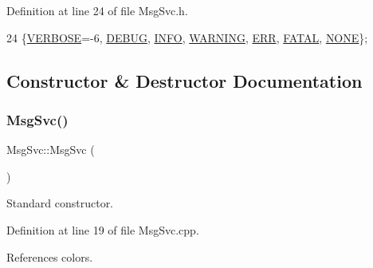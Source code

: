 Definition at line 24 of file Msg\+Svc.\+h.


\begin{DoxyCode}
24 \{\hyperlink{classMsgSvc_ae671eb7301996cd049d2da8a65925926af655256b06494ade5ba830abe5401ec9}{VERBOSE}=-6, \hyperlink{classMsgSvc_ae671eb7301996cd049d2da8a65925926a1dbdcc82dce88370ec335883c83b38b0}{DEBUG}, \hyperlink{classMsgSvc_ae671eb7301996cd049d2da8a65925926ad2fcf3f3e734fc41ee097cc23670ce51}{INFO}, \hyperlink{classMsgSvc_ae671eb7301996cd049d2da8a65925926a7cefae88f2ba26b2b05b676a383c834b}{WARNING}, \hyperlink{classMsgSvc_ae671eb7301996cd049d2da8a65925926a35a9d7166e9896af4ec8fb33bf5f1772}{ERR}, \hyperlink{classMsgSvc_ae671eb7301996cd049d2da8a65925926a59c73cb29edfc9cdf35845e2b1301363}{FATAL}, 
      \hyperlink{classMsgSvc_ae671eb7301996cd049d2da8a65925926a9be9ae32fed8e1e6eba4a58692210fbd}{NONE}\};
\end{DoxyCode}


\subsection{Constructor \& Destructor Documentation}
\mbox{\label{classMsgSvc_a67dd82487821da06312e20c1fc68b85a}} 
\subsubsection{\texorpdfstring{Msg\+Svc()}{MsgSvc()}}
{\footnotesize\ttfamily Msg\+Svc\+::\+Msg\+Svc (\begin{DoxyParamCaption}{ }\end{DoxyParamCaption})}



Standard constructor. 



Definition at line 19 of file Msg\+Svc.\+cpp.



References colors.


